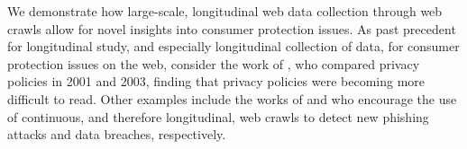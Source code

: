 We demonstrate how large-scale, longitudinal web data collection through web crawls allow for novel insights into consumer protection issues. As past precedent for longitudinal study, and especially longitudinal collection of data, for consumer protection issues on the web, consider the work of \citet{milne2006longitudinal}, who compared privacy policies in 2001 and 2003, finding that privacy policies were becoming more difficult to read. Other examples include the works of \citet{nathezhtha2019wc} and \citet{trabelsi2019monitoring} who encourage the use of continuous, and therefore longitudinal, web crawls to detect new phishing attacks and data breaches, respectively. 




